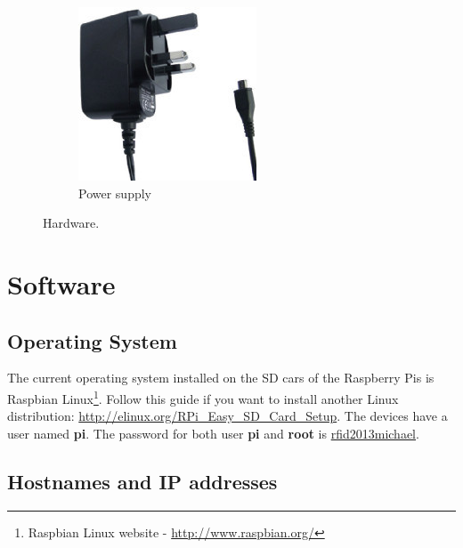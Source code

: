 \documentclass[a4paper,11pt]{scrartcl}
\begin{document}
\begin{figure}[h]
	\begin{subfigure}[b]{0.2\textwidth}
		\includegraphics[width=\textwidth]{powersupply}
		\caption{Power supply}
	\end{subfigure}
	\caption{Hardware.}
\end{figure}

\newpage
\section{Software}

\subsection{Operating System}

The current operating system installed on the SD cars of the Raspberry Pis is Raspbian Linux\footnote{Raspbian Linux website - \url{http://www.raspbian.org/}}. Follow this guide if you want to install another Linux distribution: \url{http://elinux.org/RPi_Easy_SD_Card_Setup}. The devices have a user named \textbf{pi}. The password for both user \textbf{pi} and \textbf{root} is \underline{rfid2013michael}.

\subsection{Hostnames and IP addresses}
\end{document}
